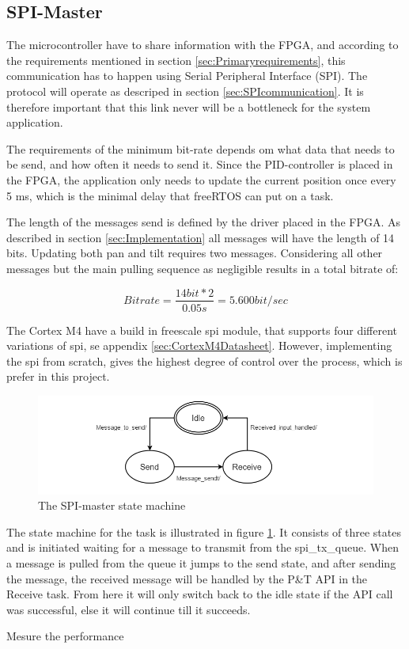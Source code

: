\subsection{SPI-Master}
\label{sec:SPIMaster}

The microcontroller have to share information with the FPGA, and according to the requirements mentioned in section \ref{sec:Primaryrequirements}, this communication has to happen using Serial Peripheral Interface (SPI). The protocol will operate as descriped in section \ref{sec:SPIcommunication}. It is therefore important that this link never will be a bottleneck for the system application. 

The requirements of the minimum bit-rate depends om what data that needs to be send, and how often it needs to send it. Since the PID-controller is placed in the FPGA, the application only needs to update the current position once every 5 ms, which is the minimal delay that freeRTOS can put on a task. 

The length of the messages send is defined by the driver placed in the FPGA. As described in section \ref{sec:Implementation} all messages will have the length of 14 bits. Updating both pan and tilt requires two messages. Considering all other messages but the main pulling sequence as negligible results in a total bitrate of:

\begin{equation}
Bitrate = \frac{
14 bit * 2	
}{
0.05s
} = 5.600 bit/sec 
\end{equation}

The Cortex M4 have a build in freescale spi module, that supports four different variations of spi, se appendix \ref{sec:CortexM4Datasheet}. However, implementing the spi from scratch, gives the highest degree of control over the process, which is prefer in this project. 

\begin{figure}
	\centering
	\includegraphics[scale = 0.7] {Billeder/SPI-master}
	\caption{The SPI-master state machine}
	\label{fig:SPI-master}
\end{figure}

The state machine for the task is illustrated in figure \ref{fig:SPI-master}. It consists of three states and is initiated waiting for a message to transmit from the spi\_tx\_queue. When a message is pulled from the queue it jumps to the send state, and after sending the message, the received message will be handled by the P\&T API in the Receive task. From here it will only switch back to the idle state if the API call was successful, else it will continue till it succeeds. 

Mesure the performance 
 

 



